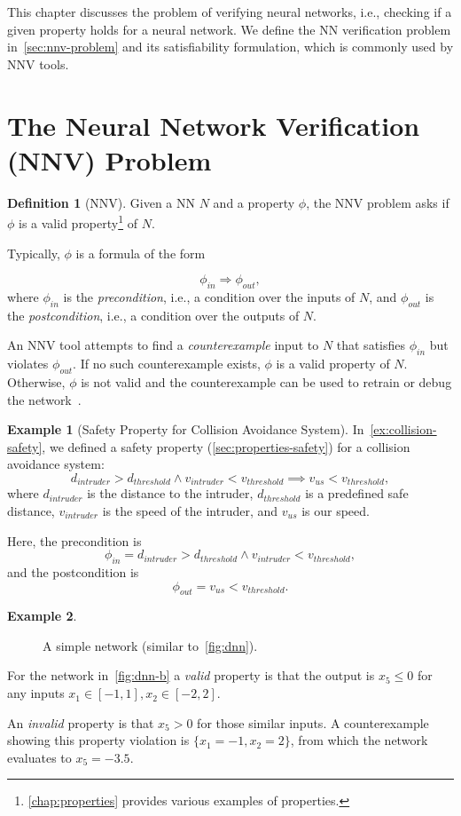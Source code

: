 \documentclass[oneside,11pt,dvipsnames]{book}
\numberwithin{equation}{section}
\theoremstyle{definition}
\newtheorem{definition}{Definition}[section]
\newtheorem{example}{Example}[section]
\theoremstyle{remark}
\begin{document}
This chapter discusses the problem of verifying neural networks, i.e., checking if a given property holds for a neural network.
We define the NN verification problem in~\autoref{sec:nnv-problem} and its satisfiability formulation, which is commonly used by NNV tools.

\section{The Neural Network Verification (NNV) Problem}\label{sec:nnv-problem}

\begin{definition}[NNV]\label{def:nnv}
Given a NN \(N\) and a property $\phi$, the NNV problem asks if $\phi$ is a valid property\footnote{\autoref{chap:properties} provides various examples of properties.} of $N$.

Typically, $\phi$ is a formula of the form

\[
\phi_{in} \Rightarrow \phi_{out},
\]
where $\phi_{in}$ is the \emph{precondition}, i.e., a condition over the inputs of $N$, and $\phi_{out}$ is the \emph{postcondition}, i.e., a condition over the outputs of $N$.

An NNV tool attempts to find a \emph{counterexample} input to $N$ that satisfies $\phi_{in}$ but violates $\phi_{out}$.  If no such counterexample exists, $\phi$ is a valid property of $N$. Otherwise, $\phi$ is not valid and the counterexample can be used to retrain or debug the network~\cite{huang2017safety}.
\end{definition}



\begin{example}[Safety Property for Collision Avoidance System]
    In~\autoref{ex:collision-safety}, we defined a safety property (\autoref{sec:properties-safety}) for a collision avoidance system:
\[
d_{intruder} > d_{threshold} \land v_{intruder} < v_{threshold} \implies v_{us} < v_{threshold},
\]
where $d_{intruder}$ is the distance to the intruder, $d_{threshold}$ is a predefined safe distance, $v_{intruder}$ is the speed of the intruder, and $v_{us}$ is our speed.

Here, the precondition is
\[
\phi_{in} = d_{intruder} > d_{threshold} \land v_{intruder} < v_{threshold},
\]
and the postcondition is
\[
\phi_{out} = v_{us} < v_{threshold}.
\]
\end{example}




\begin{example}\label{ex:dnn-b}

\begin{figure}
\centering
{}
\caption{\label{fig:dnn-b}A simple network (similar to~\autoref{fig:dnn}).}
\end{figure}

For the network in~\autoref{fig:dnn-b} a \emph{valid} property is that the output is $x_5 \le 0$ for any inputs $x_1 \in [-1,1], x_2\in[-2,2]$.

An \emph{invalid} property is that $x_5 > 0$ for those similar inputs.
A counterexample showing this property violation is $\{x_1=-1, x_2=2\}$, from which the network evaluates to $x_5=-3.5$.
\end{example}
\end{document}
